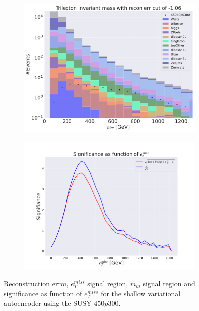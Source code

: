 \begin{figure}[H]
    \hfill
    \begin{subfigure}{.49\textwidth}
        \includegraphics[width=\textwidth]{Figures/VAE_testing/small/3lep/b_data_recon_big_rm3_feats_sig_450p0p0300_mlll_recon_errcut_-1.06.pdf}
        \caption{}
        \label{fig:VAE_3lep_small_mlll_450}
    \end{subfigure}
    \hfill   
    \begin{subfigure}{.49\textwidth}
        \includegraphics[width=\textwidth]{Figures/VAE_testing/small/3lep/significance_etmiss_450p0p0300_-1.0610372272331543.pdf}
        \caption{}
        \label{fig:VAE_3lep_small_signi_450}
    \end{subfigure}
    \hfill      
    \caption[3lep shallow network | $450p300$ | VAE]{Reconstruction error, $e_T^{miss}$ signal region, $m_{lll}$ signal region and significance as function of 
    $e_T^{miss}$ for the shallow variational autoencoder using the SUSY $450p300$.}
    \label{fig:VAE_3lep_small_rec_sig_signi_450}
\end{figure}








